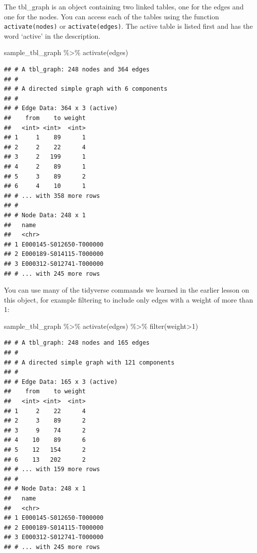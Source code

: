 \documentclass[
]{book}
\newenvironment{Shaded}{\begin{snugshade}}{\end{snugshade}}
\newcommand{\DecValTok}[1]{\textcolor[rgb]{0.00,0.00,0.81}{#1}}
\newcommand{\FunctionTok}[1]{\textcolor[rgb]{0.00,0.00,0.00}{#1}}
\newcommand{\NormalTok}[1]{#1}
\newcommand{\SpecialCharTok}[1]{\textcolor[rgb]{0.00,0.00,0.00}{#1}}
\begin{document}
The tbl\_graph is an object containing two linked tables, one for the edges and one for the nodes. You can access each of the tables using the function \texttt{activate(nodes)} or \texttt{activate(edges)}. The active table is listed first and has the word `active' in the description.

\begin{Shaded}
\begin{Highlighting}[]
\NormalTok{sample\_tbl\_graph }\SpecialCharTok{\%\textgreater{}\%} 
  \FunctionTok{activate}\NormalTok{(edges)}
\end{Highlighting}
\end{Shaded}

\begin{verbatim}
## # A tbl_graph: 248 nodes and 364 edges
## #
## # A directed simple graph with 6 components
## #
## # Edge Data: 364 x 3 (active)
##    from    to weight
##   <int> <int>  <int>
## 1     1    89      1
## 2     2    22      4
## 3     2   199      1
## 4     2    89      1
## 5     3    89      2
## 6     4    10      1
## # ... with 358 more rows
## #
## # Node Data: 248 x 1
##   name                   
##   <chr>                  
## 1 E000145-S012650-T000000
## 2 E000189-S014115-T000000
## 3 E000312-S012741-T000000
## # ... with 245 more rows
\end{verbatim}

You can use many of the tidyverse commands we learned in the earlier lesson on this object, for example filtering to include only edges with a weight of more than 1:

\begin{Shaded}
\begin{Highlighting}[]
\NormalTok{sample\_tbl\_graph }\SpecialCharTok{\%\textgreater{}\%} 
  \FunctionTok{activate}\NormalTok{(edges) }\SpecialCharTok{\%\textgreater{}\%}
  \FunctionTok{filter}\NormalTok{(weight}\SpecialCharTok{\textgreater{}}\DecValTok{1}\NormalTok{)}
\end{Highlighting}
\end{Shaded}

\begin{verbatim}
## # A tbl_graph: 248 nodes and 165 edges
## #
## # A directed simple graph with 121 components
## #
## # Edge Data: 165 x 3 (active)
##    from    to weight
##   <int> <int>  <int>
## 1     2    22      4
## 2     3    89      2
## 3     9    74      2
## 4    10    89      6
## 5    12   154      2
## 6    13   202      2
## # ... with 159 more rows
## #
## # Node Data: 248 x 1
##   name                   
##   <chr>                  
## 1 E000145-S012650-T000000
## 2 E000189-S014115-T000000
## 3 E000312-S012741-T000000
## # ... with 245 more rows
\end{verbatim}
\end{document}
